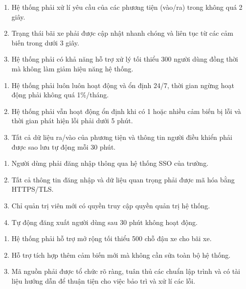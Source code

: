 \begin{enumerate}
    \item [-] Hệ thống phải xử lí yêu cầu của các phương tiện (vào/ra) trong không quá 2 giây.
    \item [-] Trạng thái bãi xe phải được cập nhật nhanh chóng và liên tục từ các cảm biến trong dưới 3 giây.
    \item [-] Hệ thống phải có khả năng hỗ trợ xử lý tối thiểu 300 người dùng đồng thời mà không làm giảm hiệu năng hệ thống.
\end{enumerate}
\begin{enumerate}
    \item [-] Hệ thống phải luôn luôn hoạt động và ổn định 24/7, thời gian ngừng hoạt động phải không quá 1\%/tháng.
    \item [-] Hệ thống phải vẫn hoạt động ổn định khi có 1 hoặc nhiều cảm biến bị lỗi và thời gian phát hiện lỗi phải dưới 5 phút.
    \item [-] Tất cả dữ liệu ra/vào của phương tiện và thông tin người điều khiển phải được sao lưu tự động mỗi 30 phút.
\end{enumerate}
\begin{enumerate}
    \item [-] Người dùng phải đăng nhập thông qua hệ thống SSO của trường.
    \item [-] Tất cả thông tin đăng nhập và dữ liệu quan trọng phải được mã hóa bằng HTTPS/TLS.
    \item [-] Chỉ quản trị viên mới có quyền truy cập quyền quản trị hệ thống.
    \item [-] Tự động đăng xuất người dùng sau 30 phút không hoạt động.
\end{enumerate}
\begin{enumerate}
    \item [-] Hệ thống phải hỗ trợ mở rộng tối thiểu 500 chỗ đậu xe cho bãi xe.
    \item [-] Hỗ trợ tích hợp thêm cảm biến mới mà không cần sửa toàn bộ hệ thống.
    \item [-] Mã nguồn phải được tổ chức rõ ràng, tuân thủ các chuẩn lập trình và có tài liệu hướng dẫn để thuận tiện cho việc bảo trì và xử lí các lỗi.
\end{enumerate}
